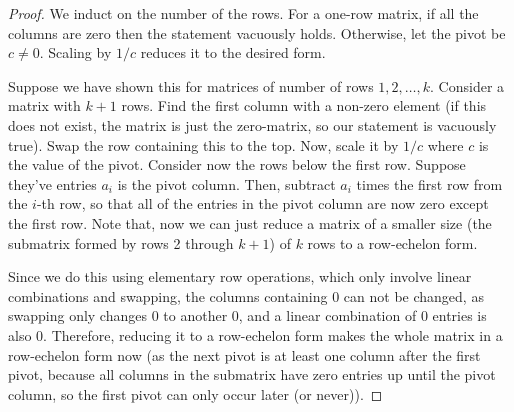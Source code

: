 \begin{proof}
We induct on the number of the rows. For a one-row matrix, if all the columns are zero
then the statement vacuously holds. Otherwise, let the pivot be $c \neq 0$. Scaling
by $1/c$ reduces it to the desired form.

Suppose we have shown this for matrices of number of rows $1, 2, \dots, k$. Consider a
matrix with $k+1$ rows. Find the first column with a non-zero element (if this does not
exist, the matrix is just the zero-matrix, so our statement is vacuously true). Swap the row containing this
to the top. Now, scale it by $1/c$ where $c$ is the value of the pivot. Consider now the rows
below the first row. Suppose they've entries $a_i$ is the pivot column.
Then, subtract $a_i$ times the first row from the $i$-th row, so that all of the
entries in the pivot column are now zero except the first row. Note that, now we can
just reduce a matrix of a smaller size (the submatrix formed by rows 2 through $k+1$) of
$k$ rows to a row-echelon form.

Since we do this using elementary row operations, which only involve
linear combinations and swapping, the columns containing $0$ can not be changed, as
swapping only changes $0$ to another $0$, and a linear combination of $0$ entries is also $0$. Therefore,
reducing it to a row-echelon form makes the whole matrix in a row-echelon form now
(as the next pivot is at least one column after the first pivot,
because all columns in the submatrix have zero entries up until the pivot column,
so the first pivot can only occur later (or never)).
\end{proof}

